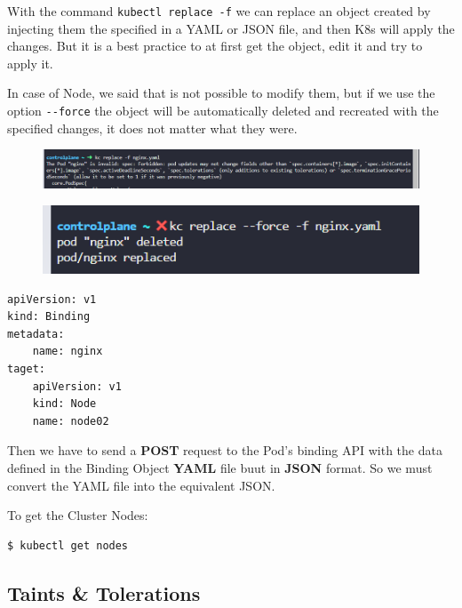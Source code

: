 \documentclass{article}
\newenvironment{blocktemplateIII}[1]{%
    \tcolorbox[beamer,%
    noparskip,breakable,
    ,colframe=Red,%
    colbacklower=LimeGreen!75!LightGreen,%
    title=#1]}%
    {\endtcolorbox}
\newenvironment{codetemplate}[1][]{%
  \mybasecolorbox[#1]
  \itshape
}{%
  \endmybasecolorbox
}
\begin{document}
\begin{blocktemplateIII}{NOTE:}
With the command \verb|kubectl replace -f| we can replace an object created by injecting them the specified in a YAML or JSON file, and then K8s will apply the changes. But it is a best practice to at first get the object, edit it and try to apply it.

In case of Node, we said that is not possible to modify them, but if we use the option \verb|--force| the object will be automatically deleted and recreated with the specified changes, it does not matter what they were.
\begin{figure}[H]
    \centering
    \includegraphics[width=\textwidth]{pictures/sch1.png}
\end{figure}
\begin{figure}[H]
    \centering
    \includegraphics[scale=0.6]{pictures/sch2.png}
\end{figure}
\end{blocktemplateIII}

\begin{codetemplate}{}
\begin{verbatim}
apiVersion: v1
kind: Binding
metadata:
    name: nginx
taget:
    apiVersion: v1
    kind: Node
    name: node02
\end{verbatim}
\end{codetemplate}

Then we have to send a \textbf{POST} request to the Pod's binding API with the data defined in the Binding Object \textbf{YAML} file buut in \textbf{JSON} format. So we must convert the YAML file into the equivalent JSON.

To get the Cluster Nodes:

\begin{codetemplate}{}
\begin{verbatim}
$ kubectl get nodes
\end{verbatim}
\end{codetemplate}

\subsection{Taints \& Tolerations}
\end{document}
